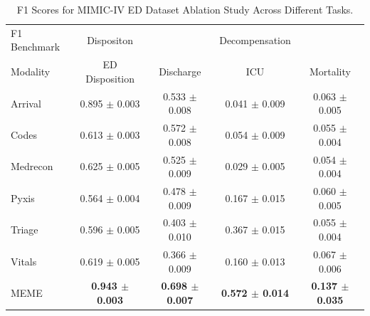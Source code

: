 \documentclass{article}
\theoremstyle{plain}
\theoremstyle{definition}
\theoremstyle{remark}
\begin{document}
\begin{table}[h!]
\centering
\caption{F1 Scores for MIMIC-IV ED Dataset Ablation Study Across Different Tasks.}
\label{r4}
\begin{adjustbox}{width=5in}
\begin{small}
\begin{sc}
\begin{tabular}{l|c|ccc}
\toprule
F1 Benchmark & Dispositon & & Decompensation &\\
Modality & ED Disposition & Discharge & ICU & Mortality \\
\midrule
Arrival & 0.895 $\pm$ 0.003 & 0.533 $\pm$ 0.008 & 0.041 $\pm$ 0.009 & 0.063 $\pm$ 0.005 \\
Codes & 0.613 $\pm$ 0.003 & 0.572 $\pm$ 0.008 & 0.054 $\pm$ 0.009 & 0.055 $\pm$ 0.004 \\
Medrecon & 0.625 $\pm$ 0.005 & 0.525 $\pm$ 0.009 & 0.029 $\pm$ 0.005 & 0.054 $\pm$ 0.004 \\
Pyxis & 0.564 $\pm$ 0.004 & 0.478 $\pm$ 0.009 & 0.167 $\pm$ 0.015 & 0.060 $\pm$ 0.005 \\
Triage & 0.596 $\pm$ 0.005 & 0.403 $\pm$ 0.010 & 0.367 $\pm$ 0.015 & 0.055 $\pm$ 0.004 \\
Vitals & 0.619 $\pm$ 0.005 & 0.366 $\pm$ 0.009 & 0.160 $\pm$ 0.013 & 0.067 $\pm$ 0.006 \\
MEME & \textbf{0.943 $\pm$ 0.003} & \textbf{0.698 $\pm$ 0.007} & \textbf{0.572 $\pm$ 0.014} & \textbf{0.137 $\pm$ 0.035} \\
\bottomrule
\end{tabular}
\end{sc}
\end{small}
\end{adjustbox}
\end{table}
\end{document}
